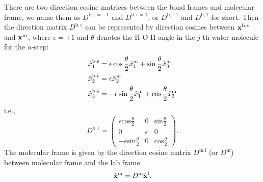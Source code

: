 There are two direction cosine matrices between the bond frames and molecular frame,
we name them as ${D}^{\text{b},\epsilon=-1}$ and  ${D}^{\text{b},\epsilon=1}$\cite{Khatib2017},
or ${D}^{\text{b},-1}$ and  ${D}^{\text{b},1}$ for short. 
Then the direction matrix ${D}^{\text{b},\epsilon} $ can be represented by direction cosines between ${\bf x}^{\text{b},\epsilon}$ and ${\bf x}^{\text m}$, 
where $\epsilon=\pm 1$ and $\theta$ denotes the H-O-H angle in the $j$-th water molecule for the $n$-step:
\begin{subequations}
\begin{align}
  &\hat x^{\text{b},\epsilon}_1 = \epsilon \cos\frac{\theta}{2} \hat x^{\text m}_1 +  \sin\frac{\theta}{2} \hat x^{\text m}_3 \\
  &\hat x^{\text{b},\epsilon}_2 = \epsilon \hat x^m_2 \\
  &\hat x^{\text{b},\epsilon}_3 = -\epsilon \sin\frac{\theta}{2} \hat x^{\text m}_1 + \cos\frac{\theta}{2} \hat x^{\text m}_3
\end{align}
\end{subequations}
i.e., 
\begin{equation}
  {D}^{\text{b},\epsilon} =\left(
  \begin{matrix}
    \epsilon\text{cos}\frac{\theta}{2} &  0  & \text{sin}\frac{\theta}{2}\\
    0 & \epsilon & 0\\
    -\epsilon\text{sin}\frac{\theta}{2} & 0 & \text{cos}\frac{\theta}{2}
  \end{matrix}
  \right).
\end{equation}
  The molecular frame is given by the direction cosine matrix ${D}^\text{m,l}$ (or ${D}^\text{m}$) between molecular frame  and the lab frame
%
\begin{subequations}
\begin{align}
  \hat {\bf x}^{\text{m}} ={D}^\text{m} \hat{\bf x}^{\text{l}}.
\end{align}
\end{subequations}

